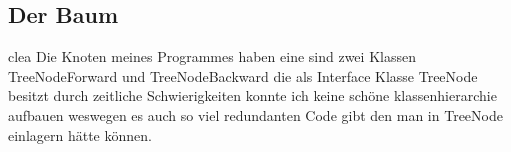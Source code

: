 \documentclass{article}
\begin{document}
\subsection*{ Der Baum }
clea
Die Knoten meines Programmes haben eine sind zwei Klassen TreeNodeForward und TreeNodeBackward die als Interface Klasse TreeNode besitzt durch zeitliche Schwierigkeiten konnte ich keine schöne klassenhierarchie aufbauen weswegen es auch so viel redundanten Code gibt den man in TreeNode einlagern hätte können. 
\end{document}

